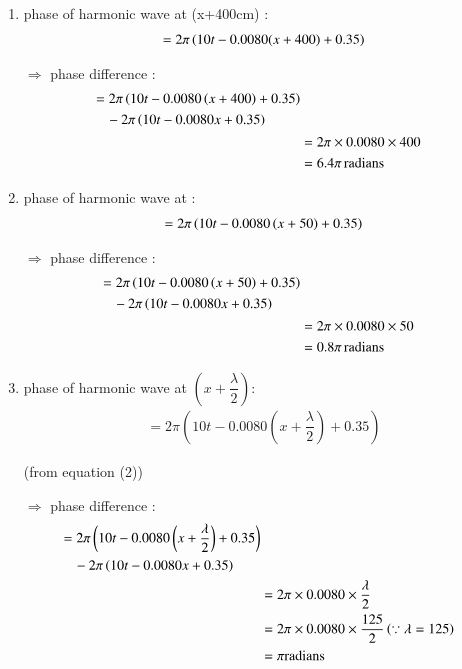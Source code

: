 \documentclass[journal,12pt,twocolumn]{IEEEtran}
\theoremstyle{remark}
\begin{document}
\begin{enumerate} [label=(\alph*)]
    \item  phase of harmonic wave at (x+400cm) :
\begin{align}
    = 2\pi \left(10t - 0.0080(x+400) + 0.35\right) 
\end{align}
\begin{center}
\end{center}

$\Rightarrow$  phase difference :
\begin{align}
    \begin{split}
        &= 2\pi \left(10t - 0.0080\left(x+400\right) + 0.35\right) \\
        &\quad - 2\pi\left(10t - 0.0080x + 0.35\right)
    \end{split}
     \\
    &= 2\pi \times 0.0080 \times 400\\
    &= 6.4 \pi\, \text{radians}
\end{align}

   \item phase of harmonic wave at  :
\begin{align}
    = 2\pi \left(10t - 0.0080\left(x+50\right) + 0.35\right)
\end{align}
\begin{center}
\end{center}

$\Rightarrow$  phase difference :
\begin{align}
    \begin{split}
        &= 2\pi\left(10t - 0.0080\left(x+50\right) + 0.35\right) \\
        &\quad - 2\pi \left(10t - 0.0080x  +0.35\right) 
    \end{split}
    \\
    &= 2\pi \times 0.0080 \times 50\\
    &= 0.8\pi \, \text{radians}
\end{align}

    \item phase of harmonic wave at $ \left (x+\dfrac{\lambda}{2}\right) $:
\begin{align}
    = 2\pi(10t - 0.0080 \left(x+\dfrac{\lambda}{2}\right) + 0.35)
\end{align}
\begin{center}
 (from equation (2))
\end{center}

$\Rightarrow$  phase difference :
\begin{align}
    \begin{split}
        &= 2\pi \left(10t - 0.0080 \left(x+\dfrac{\lambda}{2} \right) + 0.35 \right) \\
        &\quad - 2\pi \left(10t - 0.0080x  +0.35\right)
    \end{split}
    \\
    &= 2\pi \times 0.0080 \times \dfrac{\lambda}{2} \\
    &= 2\pi \times 0.0080 \times \dfrac{125}{2}   \left(\because \lambda=125\right) \\
    &= \pi \text{radians}
\end{align}
    

\end{enumerate}
\end{document}
